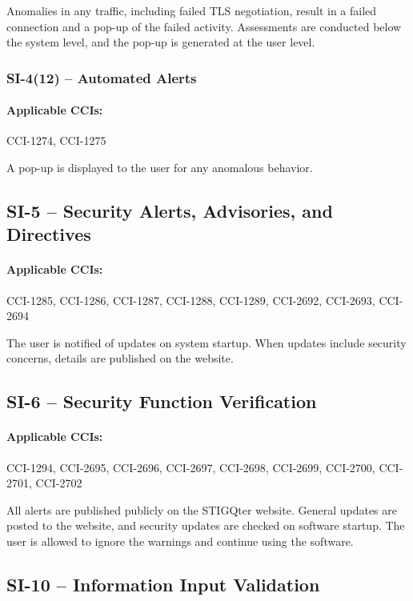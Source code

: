 \documentclass[letterpaper, 10pt, twoside]{article}
\begin{document}
Anomalies in any traffic, including failed TLS negotiation, result in a failed connection and a pop-up of the failed activity. Assessments are conducted below the system level, and the pop-up is generated at the user level.

\subsubsection{SI-4(12) -- Automated Alerts}

\paragraph{Applicable CCIs:} CCI-1274, CCI-1275

A pop-up is displayed to the user for any anomalous behavior.

\subsection{SI-5 -- Security Alerts, Advisories, and Directives}

\paragraph{Applicable CCIs:} CCI-1285, CCI-1286, CCI-1287, CCI-1288, CCI-1289, CCI-2692, CCI-2693, CCI-2694

The user is notified of updates on system startup. When updates include security concerns, details are published on the website.

\subsection{SI-6 -- Security Function Verification}

\paragraph{Applicable CCIs:} CCI-1294, CCI-2695, CCI-2696, CCI-2697, CCI-2698, CCI-2699, CCI-2700, CCI-2701, CCI-2702

All alerts are published publicly on the STIGQter website. General updates are posted to the website, and security updates are checked on software startup. The user is allowed to ignore the warnings and continue using the software.

\subsection{SI-10 -- Information Input Validation}
\end{document}
